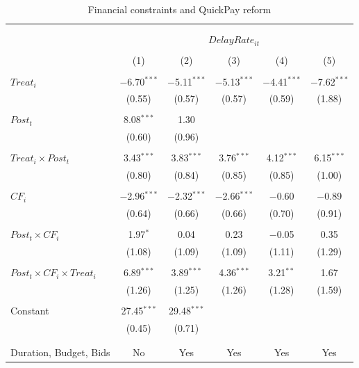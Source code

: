 \documentclass[
]{article}
\begin{document}
\begin{table}[H] \centering 
  \caption{Financial constraints and QuickPay reform} 
  \label{} 
\small 
\begin{tabular}{@{\extracolsep{-2pt}}lccccc} 
\\[-1.8ex]\hline 
\hline \\[-1.8ex] 
\\[-1.8ex] & \multicolumn{5}{c}{$DelayRate_{it}$  } \\ 
\\[-1.8ex] & (1) & (2) & (3) & (4) & (5)\\ 
\hline \\[-1.8ex] 
 $Treat_i$ & $-$6.70$^{***}$ & $-$5.11$^{***}$ & $-$5.13$^{***}$ & $-$4.41$^{***}$ & $-$7.62$^{***}$ \\ 
  & (0.55) & (0.57) & (0.57) & (0.59) & (1.88) \\ 
  & & & & & \\ 
 $Post_t$ & 8.08$^{***}$ & 1.30 &  &  &  \\ 
  & (0.60) & (0.96) &  &  &  \\ 
  & & & & & \\ 
 $Treat_i \times Post_t$ & 3.43$^{***}$ & 3.83$^{***}$ & 3.76$^{***}$ & 4.12$^{***}$ & 6.15$^{***}$ \\ 
  & (0.80) & (0.84) & (0.85) & (0.85) & (1.00) \\ 
  & & & & & \\ 
 $CF_i$ & $-$2.96$^{***}$ & $-$2.32$^{***}$ & $-$2.66$^{***}$ & $-$0.60 & $-$0.89 \\ 
  & (0.64) & (0.66) & (0.66) & (0.70) & (0.91) \\ 
  & & & & & \\ 
 $Post_t \times CF_i$ & 1.97$^{*}$ & 0.04 & 0.23 & $-$0.05 & 0.35 \\ 
  & (1.08) & (1.09) & (1.09) & (1.11) & (1.29) \\ 
  & & & & & \\ 
 $Post_t \times CF_i \times Treat_i$ & 6.89$^{***}$ & 3.89$^{***}$ & 4.36$^{***}$ & 3.21$^{**}$ & 1.67 \\ 
  & (1.26) & (1.25) & (1.26) & (1.28) & (1.59) \\ 
  & & & & & \\ 
 Constant & 27.45$^{***}$ & 29.48$^{***}$ &  &  &  \\ 
  & (0.45) & (0.71) &  &  &  \\ 
  & & & & & \\ 
\hline \\[-1.8ex] 
Duration, Budget, Bids & No & Yes & Yes & Yes & Yes \\ 

\end{tabular}
\end{table}
\end{document}
